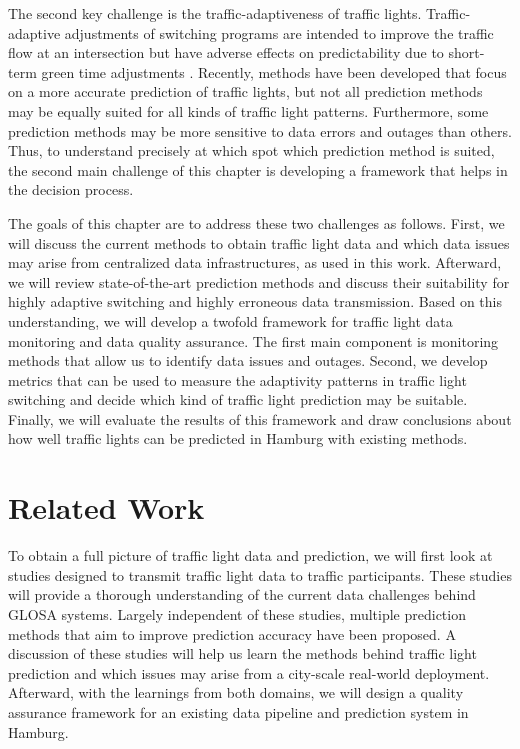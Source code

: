 The second key challenge is the traffic-adaptiveness of traffic lights. Traffic-adaptive adjustments of switching programs are intended to improve the traffic flow at an intersection but have adverse effects on predictability due to short-term green time adjustments \cite{schweiger_elisatm_2011, bodenheimer_enabling_2014}. Recently, methods have been developed that focus on a more accurate prediction of traffic lights, but not all prediction methods may be equally suited for all kinds of traffic light patterns. Furthermore, some prediction methods may be more sensitive to data errors and outages than others. Thus, to understand precisely at which spot which prediction method is suited, the second main challenge of this chapter is developing a framework that helps in the decision process.

The goals of this chapter are to address these two challenges as follows. First, we will discuss the current methods to obtain traffic light data and which data issues may arise from centralized data infrastructures, as used in this work. Afterward, we will review state-of-the-art prediction methods and discuss their suitability for highly adaptive switching and highly erroneous data transmission. Based on this understanding, we will develop a twofold framework for traffic light data monitoring and data quality assurance. The first main component is monitoring methods that allow us to identify data issues and outages. Second, we develop metrics that can be used to measure the adaptivity patterns in traffic light switching and decide which kind of traffic light prediction may be suitable. Finally, we will evaluate the results of this framework and draw conclusions about how well traffic lights can be predicted in Hamburg with existing methods.

\section{Related Work}

To obtain a full picture of traffic light data and prediction, we will first look at studies designed to transmit traffic light data to traffic participants. These studies will provide a thorough understanding of the current data challenges behind GLOSA systems. Largely independent of these studies, multiple prediction methods that aim to improve prediction accuracy have been proposed. A discussion of these studies will help us learn the methods behind traffic light prediction and which issues may arise from a city-scale real-world deployment. Afterward, with the learnings from both domains, we will design a quality assurance framework for an existing data pipeline and prediction system in Hamburg.

